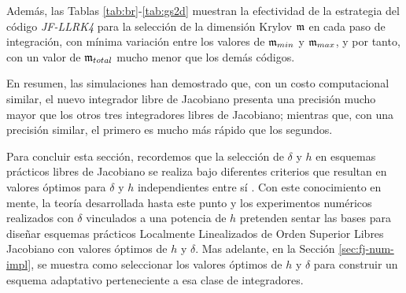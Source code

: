 Además, las Tablas \ref{tab:br}-\ref{tab:gs2d} muestran la efectividad de la estrategia del código \textit{JF-LLRK4} para la selección de la dimensión Krylov $\mathfrak{m}$ en cada paso de integración, con mínima variación entre los valores de $\mathfrak{m}_{min}$ y $\mathfrak{m}_{max}$, y por tanto, con un valor de $\mathfrak{m}_{total}$ mucho menor que los demás códigos.

En resumen, las simulaciones han demostrado que, con un costo computacional similar, el nuevo integrador libre de Jacobiano presenta una precisión mucho mayor que los otros tres integradores libres de Jacobiano; mientras que, con una precisión similar, el primero es mucho más rápido que los segundos.

Para concluir esta sección, recordemos que la selección de $\delta$ y $h$ en esquemas prácticos libres de Jacobiano se realiza bajo diferentes criterios que resultan en valores óptimos para $\delta$ y $h$ independientes entre sí \cite{knoll2004jacobian}. Con este conocimiento en mente, la teoría desarrollada hasta este punto y los experimentos numéricos realizados con $\delta$ vinculados a una potencia de $h$ pretenden sentar las bases para diseñar esquemas prácticos Localmente Linealizados de Orden Superior Libres Jacobiano con valores óptimos de $h$ y $\delta$. Mas adelante, en la Sección \ref{sec:fj-num-impl}, se muestra como seleccionar los valores óptimos de $h$ y $\delta$ para construir un esquema adaptativo perteneciente a esa clase de integradores.


